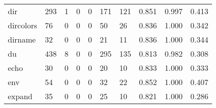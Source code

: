 \begin{longtable}{lp{1.3cm}p{1.3cm}p{1.3cm}p{1.3cm}p{1.3cm}p{1.3cm}p{1.3cm}p{1.3cm}p{1.3cm}}
dir       &                    293 &                                             1 &                                            0 &                                           0 &                                          171 &                                        121 &                                0.851 &                                  0.997 &                                0.413 \\
dircolors &                     76 &                                             0 &                                            0 &                                           0 &                                           50 &                                         26 &                                0.836 &                                  1.000 &                                0.342 \\
dirname   &                     32 &                                             0 &                                            0 &                                           0 &                                           21 &                                         11 &                                0.836 &                                  1.000 &                                0.344 \\
du        &                    438 &                                             8 &                                            0 &                                           0 &                                          295 &                                        135 &                                0.813 &                                  0.982 &                                0.308 \\
echo      &                     30 &                                             0 &                                            0 &                                           0 &                                           20 &                                         10 &                                0.833 &                                  1.000 &                                0.333 \\
env       &                     54 &                                             0 &                                            0 &                                           0 &                                           32 &                                         22 &                                0.852 &                                  1.000 &                                0.407 \\
expand    &                     35 &                                             0 &                                            0 &                                           0 &                                           25 &                                         10 &                                0.821 &                                  1.000 &                                0.286 \\

\end{longtable}

